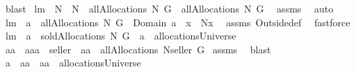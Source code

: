 \begin{isabellebody}
%
\isadelimproof
%
\endisadelimproof
%
\isatagproof
{}\isamarkupfalse%
\ blast%
\endisatagproof
{\isafoldproof}%
%
\isadelimproof
\isanewline
%
\endisadelimproof
{}\isamarkupfalse%
\ lm{}{}{\isacharcolon}\ \ {\isachardoublequoteopen}N{}\ {\isasymsubseteq}\ N{}{\isachardoublequoteclose}\ \ {\isachardoublequoteopen}allAllocations{\isacharprime}{\isacharprime}\ N{}\ G\ {\isasymsubseteq}\ allAllocations{\isacharprime}{\isacharprime}\ N{}\ G{\isachardoublequoteclose}\ \isanewline
%
\isadelimproof
%
\endisadelimproof
%
\isatagproof
{}\isamarkupfalse%
\ assms\ \isamarkupfalse%
\ auto%
\endisatagproof
{\isafoldproof}%
%
\isadelimproof
\isanewline
%
\endisadelimproof
{}\isamarkupfalse%
\ lm{}{}{\isacharcolon}\ \ {\isachardoublequoteopen}a\ {\isasymin}\ allAllocations{\isacharprime}{\isacharprime}\ N\ G{\isachardoublequoteclose}\ \ {\isachardoublequoteopen}Domain\ {\isacharparenleft}a\ {\isacharminus}{\isacharminus}\ x{\isacharparenright}\ {\isasymsubseteq}\ N{\isacharminus}{\isacharbraceleft}x{\isacharbraceright}{\isachardoublequoteclose}\ \isanewline
%
\isadelimproof
%
\endisadelimproof
%
\isatagproof
{}\isamarkupfalse%
\ assms\ Outside{\isacharunderscore}def\ \isamarkupfalse%
\ fastforce%
\endisatagproof
{\isafoldproof}%
%
\isadelimproof
\isanewline
%
\endisadelimproof
{}\isamarkupfalse%
\ lm{}{}{\isacharcolon}\ \ {\isachardoublequoteopen}a\ {\isasymin}\ soldAllocations\ N\ G{\isachardoublequoteclose}\ \ {\isachardoublequoteopen}a\ {\isasymin}\ allocationsUniverse{\isachardoublequoteclose}\isanewline
%
\isadelimproof
%
\endisadelimproof
%
\isatagproof
{}\isamarkupfalse%
\ {\isacharminus}\isanewline
{}\isamarkupfalse%
\ aa\ \ {\isachardoublequoteopen}a{\isacharequal}aa\ {\isacharminus}{\isacharminus}\ seller\ {\isacharampersand}\ aa\ {\isasymin}\ allAllocations\ {\isacharparenleft}N{\isasymunion}{\isacharbraceleft}seller{\isacharbraceright}{\isacharparenright}\ G{\isachardoublequoteclose}\isanewline
{}\isamarkupfalse%
\ assms\ \isamarkupfalse%
\ blast\isanewline
{}\isamarkupfalse%
\ \isamarkupfalse%
\ {\isachardoublequoteopen}a\ {\isasymsubseteq}\ aa\ {\isacharampersand}\ aa\ {\isasymin}\ allocationsUniverse{\isachardoublequoteclose}\ \isamarkupfalse%

\end{isabellebody}
